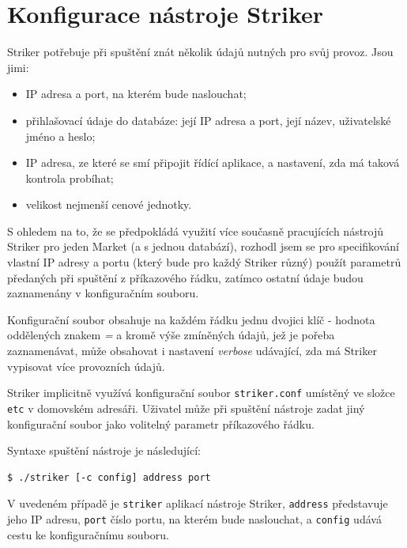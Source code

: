 \documentclass[thesis=M,czech]{FITthesis}[2012/06/26]
\begin{document}

\section{Konfigurace nástroje Striker}

Striker potřebuje při spuštění znát několik údajů nutných pro svůj provoz. Jsou jimi: 

\begin{itemize}
	\item IP adresa a port, na kterém bude naslouchat;
	\item přihlašovací údaje do databáze: její IP adresa a port, její název, uživatelské jméno a heslo;
	\item IP adresa, ze které se smí připojit řídící aplikace, a nastavení, zda má taková kontrola probíhat;
	\item velikost nejmenší cenové jednotky.
\end{itemize}

S ohledem na to, že se předpokládá využití více současně pracujících nástrojů Striker pro jeden Market (a s jednou databází), 
rozhodl jsem se pro specifikování vlastní IP adresy a portu (který bude pro každý Striker různý) použít parametrů předaných 
při spuštění z příkazového řádku, zatímco ostatní údaje budou zaznamenány v konfiguračním souboru.

Konfigurační soubor obsahuje na každém řádku jednu dvojici klíč - hodnota oddělených znakem \textit{=} a kromě výše zmíněných
údajů, jež je pořeba zaznamenávat, může obsahovat i nastavení \textit{verbose} udávající, zda má Striker vypisovat více 
provozních údajů. 

Striker implicitně využívá konfigurační soubor \texttt{striker.conf} umístěný ve složce \texttt{etc} v domovském adresáři. 
Uživatel může při spuštění nástroje zadat jiný konfigurační soubor jako volitelný parametr příkazového řádku.

Syntaxe spuštění nástroje je následující:

\begin{lstlisting}[basicstyle={\small\ttfamily}] 
   $ ./striker [-c config] address port
\end{lstlisting}

V uvedeném případě je \texttt{striker} aplikací nástroje Striker, \texttt{address} představuje jeho IP adresu, \texttt{port} 
číslo portu, na kterém bude naslouchat, a \texttt{config} udává cestu ke konfiguračnímu souboru. 
\end{document}
